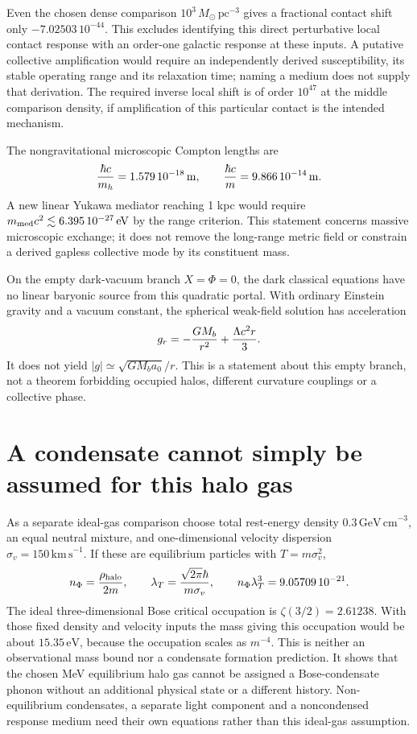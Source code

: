 \documentclass[11pt]{article}
\begin{document}
Even the chosen dense comparison $10^3\,M_\odot\,\mathrm{pc}^{-3}$
gives a fractional contact shift only $-7.02503\,10^{-44}$.
This excludes identifying this direct perturbative local contact response
with an order-one galactic response at these inputs. A putative collective
amplification would require an independently derived susceptibility, its
stable operating range and its relaxation time; naming a medium does not
supply that derivation. The required inverse local shift is of order
$10^{47}$ at the middle comparison density, if amplification of this
particular contact is the intended mechanism.

The nongravitational microscopic Compton lengths are
\begin{equation}
 {\hbar c\over m_h}=1.579\,10^{-18}\,\mathrm m,\qquad
 {\hbar c\over m}=9.866\,10^{-14}\,\mathrm m.
\end{equation}
A new linear Yukawa mediator reaching 1 kpc would require
$m_{\rm med}c^2\lesssim6.395\,10^{-27}\,\mathrm{eV}$ by the
range criterion. This statement concerns massive microscopic exchange;
it does not remove the long-range metric field or constrain a derived
gapless collective mode by its constituent mass.

On the empty dark-vacuum branch $X=\Phi=0$, the dark classical equations
have no linear baryonic source from this quadratic portal. With ordinary
Einstein gravity and a vacuum constant, the spherical weak-field solution
has acceleration
\begin{equation}
 g_r=-{GM_b\over r^2}+{\Lambda c^2 r\over3}.
\end{equation}
It does not yield $|g|\simeq\sqrt{GM_ba_0}/r$. This is a statement
about this empty branch, not a theorem forbidding occupied halos,
different curvature couplings or a collective phase.

\section{A condensate cannot simply be assumed for this halo gas}
As a separate ideal-gas comparison choose total rest-energy density
$0.3\,\mathrm{GeV\,cm}^{-3}$, an equal neutral mixture, and
one-dimensional velocity dispersion $\sigma_v=150\,\mathrm{km\,s}^{-1}$.
If these are equilibrium particles with $T=m\sigma_v^2$,
\begin{equation}
 n_\Phi={\rho_{\rm halo}\over2m},\qquad
 \lambda_T={\sqrt{2\pi}\hbar\over m\sigma_v},\qquad
 n_\Phi\lambda_T^3=9.05709\,10^{-21}.
\end{equation}
The ideal three-dimensional Bose critical occupation is
$\zeta(3/2)=2.61238$. With those fixed density and velocity inputs the
mass giving this occupation would be about $15.35\,\mathrm{eV}$,
because the occupation scales as $m^{-4}$. This is neither an observational
mass bound nor a condensate formation prediction. It shows that the chosen
MeV equilibrium halo gas cannot be assigned a Bose-condensate phonon
without an additional physical state or a different history. Non-equilibrium
condensates, a separate light component and a noncondensed response medium
need their own equations rather than this ideal-gas assumption.
\end{document}
